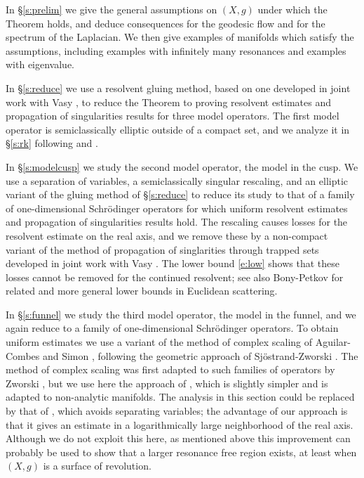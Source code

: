 \documentclass[reqno, 12pt]{amsart}
\theoremstyle{definition}
\numberwithin{equation}{section}
\numberwithin{prop}{section}
\numberwithin{figure}{section}
\begin{document}

In \S\ref{s:prelim} we give the general assumptions on $(X,g)$ under which the Theorem holds, and deduce  consequences for the geodesic flow and for the spectrum of the Laplacian. We then give examples of manifolds which satisfy the assumptions, including examples with infinitely many resonances and examples with eigenvalue.

In \S\ref{s:reduce} we use a resolvent gluing method, based on one developed in joint work with Vasy \cite{Datchev-Vasy:Gluing}, to reduce the Theorem to proving resolvent estimates and propagation of singularities results for three model operators. The first  model operator  is semiclassically elliptic outside of a compact set, and we analyze it in \S\ref{s:rk} following \cite{sz} and \cite{Datchev-Vasy:Gluing}.

In \S\ref{s:modelcusp} we study the second model operator, the model in the cusp. We use a separation of variables, a semiclassically singular rescaling, and an elliptic variant of the gluing method of \S\ref{s:reduce} to reduce its study to that of a family of one-dimensional Schr\"odinger operators for which uniform resolvent estimates and propagation of singularities results hold. %
The  rescaling causes losses for the resolvent estimate on the real axis, and we remove these by a non-compact variant of the method of propagation of singlarities through trapped sets developed in joint work with Vasy \cite{Datchev-Vasy:Propagation}. The lower bound \eqref{e:low} shows that these losses cannot  be removed for the continued resolvent; see also Bony-Petkov \cite{bp} for related and more general lower bounds in Euclidean scattering.

In \S\ref{s:funnel} we study the third model operator, the model in the funnel, and we again reduce to a  family of one-dimensional Schr\"odinger operators. To obtain uniform estimates we use a variant of the method of complex scaling of Aguilar-Combes \cite{ac} and Simon \cite{sim}, following the geometric approach of Sj\"ostrand-Zworski \cite{sz2}. The method of complex scaling was first adapted to such families of operators by Zworski \cite{z}, but we use here the approach of \cite{Datchev:Thesis}, which is slightly simpler and is adapted to non-analytic manifolds. The analysis in this section could be replaced by that of \cite{Vasy}, which avoids separating variables; the advantage of our approach is that it gives an estimate in a logarithmically large neighborhood of the real axis. Although we do not exploit this here, as mentioned above this improvement can probably be used to show that a larger resonance free region exists, at least when $(X,g)$ is a surface of revolution.
\end{document}
